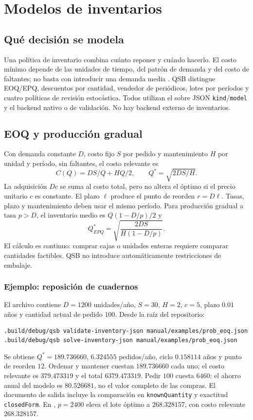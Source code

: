 \chapter{Modelos de inventarios}
\label{ch:inventarios}

\section{Qué decisión se modela}
Una política de inventario combina cuánto reponer y cuándo hacerlo. El costo
mínimo depende de las unidades de tiempo, del patrón de demanda y del costo de
faltantes; no basta con introducir una demanda media
\cite{harris1913many,silver1998inventory}. QSB distingue EOQ/EPQ, descuentos
por cantidad, vendedor de periódicos, lotes por períodos y cuatro políticas de
revisión estocástica. Todos utilizan el sobre JSON \texttt{kind}/\texttt{model}
y el backend nativo o de validación. No hay backend externo de inventarios.

\section{EOQ y producción gradual}
Con demanda constante \(D\), costo fijo \(S\) por pedido y mantenimiento \(H\)
por unidad y período, sin faltantes, el costo relevante es
\[
 C(Q)=DS/Q+HQ/2,\qquad Q^*=\sqrt{2DS/H}.
\]
La adquisición \(Dc\) se suma al costo total, pero no altera el óptimo si el
precio unitario \(c\) es constante. El plazo \(\ell\) produce el punto de
reorden \(r=D\ell\). Tasas, plazo y mantenimiento deben usar el mismo período.
Para producción gradual a tasa \(p>D\), el inventario medio es
\(Q(1-D/p)/2\) y
\[
 Q^*_{EPQ}=\sqrt{\frac{2DS}{H(1-D/p)}}.
\]
El cálculo es continuo: comprar cajas o unidades enteras requiere comparar
cantidades factibles. QSB no introduce automáticamente restricciones de embalaje.

\subsection{Ejemplo: reposición de cuadernos}
El archivo  contiene \(D=1200\)
unidades/año, \(S=30\), \(H=2\), \(c=5\), plazo \(0.01\) años y cantidad
actual de pedido \(100\). Desde la raíz del repositorio:
\begin{lstlisting}
.build/debug/qsb validate-inventory-json manual/examples/prob_eoq.json
.build/debug/qsb solve-inventory-json manual/examples/prob_eoq.json
\end{lstlisting}
Se obtiene \(Q^*=189.736660\), \(6.324555\) pedidos/año, ciclo
\(0.158114\) años y punto de reorden \(12\). Ordenar y mantener cuestan
\(189.736660\) cada uno; el costo relevante es \(379.473319\) y el total
\(6379.473319\). Pedir \(100\) cuesta \(6460\): el ahorro anual del modelo
es \(80.526681\), no el valor completo de las compras. El documento de salida
incluye la comparación en \texttt{knownQuantity} y exactitud
\texttt{closedForm}. En , \(p=2400\) eleva el lote
óptimo a \(268.328157\), con costo relevante \(268.328157\).

